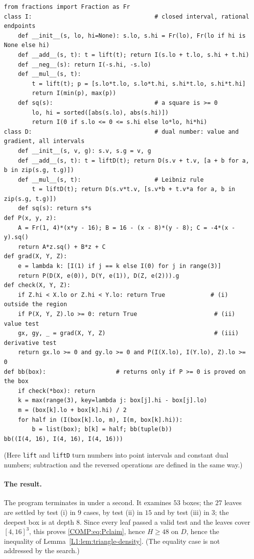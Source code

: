 {\footnotesize
\begin{verbatim}
from fractions import Fraction as Fr
class I:                                   # closed interval, rational endpoints
    def __init__(s, lo, hi=None): s.lo, s.hi = Fr(lo), Fr(lo if hi is None else hi)
    def __add__(s, t): t = lift(t); return I(s.lo + t.lo, s.hi + t.hi)
    def __neg__(s): return I(-s.hi, -s.lo)
    def __mul__(s, t):
        t = lift(t); p = [s.lo*t.lo, s.lo*t.hi, s.hi*t.lo, s.hi*t.hi]
        return I(min(p), max(p))
    def sq(s):                             # a square is >= 0
        lo, hi = sorted([abs(s.lo), abs(s.hi)])
        return I(0 if s.lo <= 0 <= s.hi else lo*lo, hi*hi)
class D:                                   # dual number: value and gradient, all intervals
    def __init__(s, v, g): s.v, s.g = v, g
    def __add__(s, t): t = liftD(t); return D(s.v + t.v, [a + b for a, b in zip(s.g, t.g)])
    def __mul__(s, t):                     # Leibniz rule
        t = liftD(t); return D(s.v*t.v, [s.v*b + t.v*a for a, b in zip(s.g, t.g)])
    def sq(s): return s*s
def P(x, y, z):
    A = Fr(1, 4)*(x*y - 16); B = 16 - (x - 8)*(y - 8); C = -4*(x - y).sq()
    return A*z.sq() + B*z + C
def grad(X, Y, Z):
    e = lambda k: [I(1) if j == k else I(0) for j in range(3)]
    return P(D(X, e(0)), D(Y, e(1)), D(Z, e(2))).g
def check(X, Y, Z):
    if Z.hi < X.lo or Z.hi < Y.lo: return True             # (i)   outside the region
    if P(X, Y, Z).lo >= 0: return True                      # (ii)  value test
    gx, gy, _ = grad(X, Y, Z)                               # (iii) derivative test
    return gx.lo >= 0 and gy.lo >= 0 and P(I(X.lo), I(Y.lo), Z).lo >= 0
def bb(box):                    # returns only if P >= 0 is proved on the box
    if check(*box): return
    k = max(range(3), key=lambda j: box[j].hi - box[j].lo)
    m = (box[k].lo + box[k].hi) / 2
    for half in (I(box[k].lo, m), I(m, box[k].hi)):
        b = list(box); b[k] = half; bb(tuple(b))
bb((I(4, 16), I(4, 16), I(4, 16)))
\end{verbatim}
}
\noindent (Here \texttt{lift} and \texttt{liftD} turn numbers into point intervals and constant dual
numbers; subtraction and the reversed operations are defined in the same way.)

\paragraph{The result.} The program terminates in under a second. It examines $53$ boxes; the $27$ leaves
are settled by test (i) in $9$ cases, by test (ii) in $15$ and by test (iii) in $3$; the deepest box is at
depth $8$. Since every leaf passed a valid test and the leaves cover $[4,16]^3$, this proves
\eqref{COMP:eq:Pclaim}, hence $H\ge48$ on $D$, hence the inequality of
Lemma~\ref{L1:lem:triangle-density}. (The equality case is not addressed by the search.)

